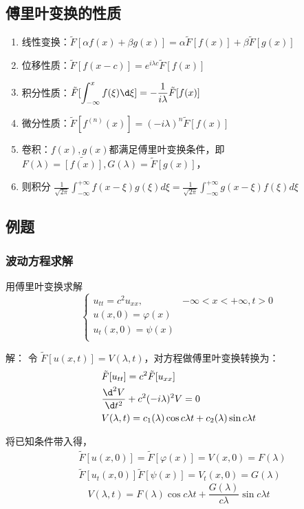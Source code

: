 \documentclass{article}
\begin{document}
\subsection{傅里叶变换的性质}
\begin{enumerate}
\item 线性变换：$\tilde{F}[\alpha f(x) + \beta g(x)]=\alpha \tilde{F}[f(x)]+\beta \tilde{F}[g(x)]$
\item 位移性质：$\tilde{F}[f(x-c)]=e^{i\lambda c}\tilde{F}[f(x)]$
\item 积分性质：$\displaystyle \tilde{F}[\int_{-\infty}^xf(\xi) \d \xi ]=-\frac{1}{i\lambda }\tilde{F}[f(x)]$
\item 微分性质：$\tilde{F}[f^{(n)}(x)]=(-i\lambda )^{n}\tilde{F}[f(x)]$
\item 卷积：$f(x),g(x)$都满足傅里叶变换条件，即 $F(\lambda)=\tilde{[f(x)]},G(\lambda )=\tilde{F}[g(x)]$，
\item 则积分 $\displaystyle \frac{1}{\sqrt{2\pi }}\int_{-\infty}^{+\infty}f(x-\xi )g(\xi )d \xi =\displaystyle \frac{1}{\sqrt{2\pi }}\int_{-\infty}^{+\infty}g(x-\xi )f(\xi )d \xi$
\end{enumerate}

\subsection{例题}
\subsubsection*{波动方程求解}
用傅里叶变换求解
$$
\begin{cases}
    u_{tt}=c^2u_{xx}, &-\infty <x <+\infty ,t>0\\
    u(x,0)=\varphi(x)  &\\
    u_t(x,0)=\psi(x) &\\
\end{cases}
$$

解： \quad 令 $\tilde{F}[u(x,t)]=V(\lambda ,t)$，对方程做傅里叶变换转换为：
$$
\begin{aligned}
    &\tilde{F}[u_{tt}] = c^2\tilde{F}[u_{xx}] \\
    &\frac{\d^2 V}{\d t^2 }+c^2(-i\lambda )^2V=   0 \\
    &V(\lambda ,t)=c_1(\lambda )\cos c\lambda t+c_2(\lambda )\sin c\lambda t
\end{aligned}
$$

将已知条件带入得，
$$
\begin{aligned}
    &\tilde{F}[u(x,0)]=\tilde{F}[\varphi (x)]=V(x,0)=F(\lambda ) \\
    &\tilde{F}[u_t (x,0)]\tilde{F}[\psi (x)]=V_t(x,0)=G(\lambda ) 
\end{aligned}
$$
$$
V(\lambda ,t)=F(\lambda )\cos c\lambda t+\frac{G(\lambda )}{c\lambda } \sin c\lambda t
$$
\end{document}
